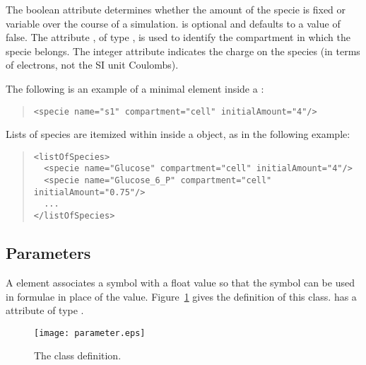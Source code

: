 \documentclass[10pt]{cek-article}
\begin{document}
The boolean attribute  determines whether the
amount of the specie is fixed or variable over the course of a simulation.
 is optional and defaults to a value of false.
The attribute , of type , is used to
identify the compartment in which the specie belongs.  The integer
attribute  indicates the charge on the species (in terms of
electrons, not the SI unit Coulombs).

The following is an example of a minimal  element inside a
:
\begin{quote}
  \begin{small}
    \tightspacing
\begin{verbatim}
<specie name="s1" compartment="cell" initialAmount="4"/>
\end{verbatim}
    \regularspacing
  \end{small}
\end{quote}

Lists of species are itemized within  inside a
 object, as in the following example:
\begin{quote}
  \begin{small}
    \tightspacing
\begin{verbatim}
<listOfSpecies>
  <specie name="Glucose" compartment="cell" initialAmount="4"/>
  <specie name="Glucose_6_P" compartment="cell" initialAmount="0.75"/>
  ...
</listOfSpecies>
\end{verbatim}
    \regularspacing
  \end{small}
\end{quote}

\subsection{Parameters}

A  element associates a symbol with a float value
so that the symbol can be used in formulae in place of the value.
Figure~\ref{fig:parameter} gives the definition of this class.
 has a  attribute of type .
\begin{figure}[htb]
  \centering
  \texttt{[image: parameter.eps]}
  \caption{The  class definition.}
  \label{fig:parameter}
\end{figure}
\end{document}
